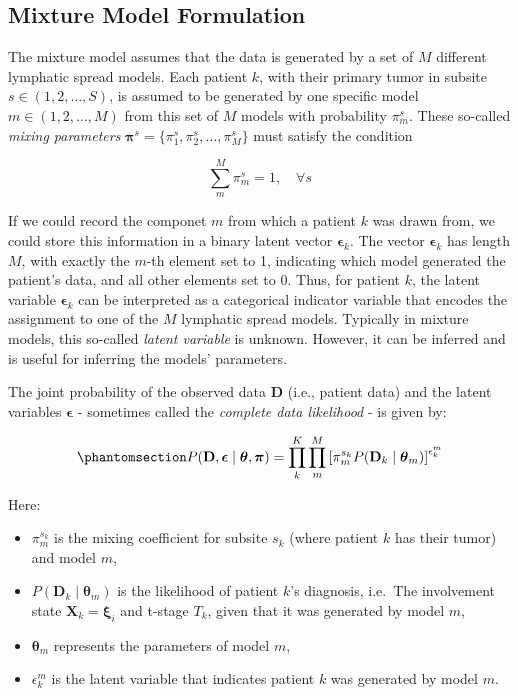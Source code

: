 \documentclass[
  sn-mathphys-num,
]{sn-jnl}
\providecommand{\tightlist}{%
  \setlength{\itemsep}{0pt}\setlength{\parskip}{0pt}}\usepackage{longtable,booktabs,array}
\begin{document}
\subsection{Mixture Model Formulation}\label{mixture-model-formulation}

The mixture model assumes that the data is generated by a set of \(M\)
different lymphatic spread models. Each patient \(k\), with their
primary tumor in subsite \(s \in (1, 2, \ldots, S)\), is assumed to be
generated by one specific model \(m \in (1, 2, \ldots, M)\) from this
set of \(M\) models with probability \(\pi_m^s\). These so-called
\emph{mixing parameters}
\(\boldsymbol{\pi}^s = \{\pi_1^s, \pi_2^s, \dots, \pi_M^s\}\) must
satisfy the condition

\[
\sum_{m}^M \pi_m^s = 1, \quad \forall s
\]

If we could record the componet \(m\) from which a patient \(k\) was
drawn from, we could store this information in a binary latent vector
\(\boldsymbol{\epsilon}_k\). The vector \(\boldsymbol{\epsilon}_k\) has
length \(M\), with exactly the \(m\)-th element set to 1, indicating
which model generated the patient's data, and all other elements set to
0. Thus, for patient \(k\), the latent variable
\(\boldsymbol{\epsilon}_k\) can be interpreted as a categorical
indicator variable that encodes the assignment to one of the \(M\)
lymphatic spread models. Typically in mixture models, this so-called
\emph{latent variable} is unknown. However, it can be inferred and is
useful for inferring the models' parameters.

The joint probability of the observed data \(\mathbf{D}\) (i.e., patient
data) and the latent variables \(\boldsymbol{\epsilon}\) - sometimes
called the \emph{complete data likelihood} - is given by:

\begin{equation}\phantomsection\label{eq-complete-likelihood}{
P(\mathbf{D}, \boldsymbol{\epsilon} \mid \boldsymbol{\theta}, \boldsymbol{\pi}) = \prod_{k}^{K} \prod_{m}^{M} \left[ \pi_m^{s_k} P(\mathbf{D}_k \mid \boldsymbol{\theta}_m) \right]^{\epsilon_{k}^m}
}\end{equation}

Here:

\begin{itemize}
\tightlist
\item
  \(\pi_m^{s_k}\) is the mixing coefficient for subsite \(s_k\) (where
  patient \(k\) has their tumor) and model \(m\),
\item
  \(P(\mathbf{D}_k \mid \boldsymbol{\theta}_m)\) is the likelihood of
  patient \(k\)'s diagnosis, i.e.~The involvement state
  \(\mathbf{X}_k = \boldsymbol{\xi}_i\) and t-stage \(T_k\), given that
  it was generated by model \(m\),
\item
  \(\boldsymbol{\theta}_m\) represents the parameters of model \(m\),
\item
  \(\epsilon_{k}^m\) is the latent variable that indicates patient \(k\)
  was generated by model \(m\).
\end{itemize}
\end{document}

